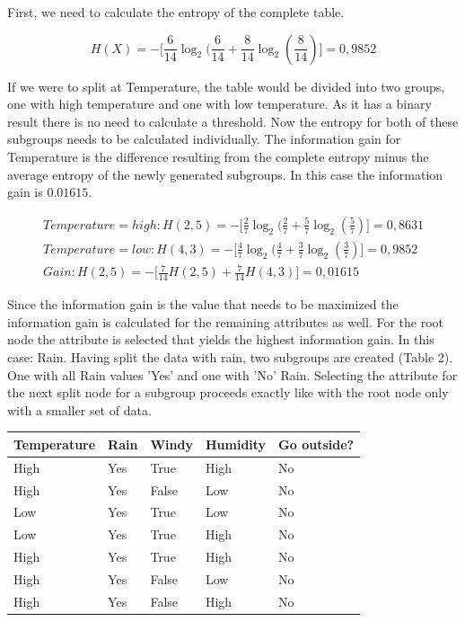 \documentclass[
12pt,
headsepline,
bibliography=totoc,
twoside=semi,
fleqn
]{scrartcl}
\begin{document}
 First, we need to calculate the entropy of the complete table. 

\begin{equation}\label{fig:fig8}
   H(X)= - \biggl[\frac{6}{14}\log_2(\frac{6}{14}+\frac{8}{14}\log_2(\frac{8}{14})\biggr]=0,9852
\end{equation}  

 If we were to split at Temperature, the table would be divided into two groups, one with high temperature and one with low temperature. As it has a binary result there is no need to calculate a threshold. Now the entropy for both of these subgroups needs to be calculated individually. The information gain for Temperature is the difference resulting from the complete entropy minus the average entropy of the newly generated subgroups. In this case the information gain is $0.01615$. 

 \begin{equation}\label{fig:fig7}
   \begin{split}
   Temperature=high: H(2,5)= -\biggl[\frac{2}{7}\log_2(\frac{2}{7}+\frac{5}{7}\log_2(\frac{5}{7})\biggr]=0,8631
   \\
   Temperature=low: H(4,3)= -\biggl[\frac{4}{7}\log_2(\frac{4}{7}+\frac{3}{7}\log_2(\frac{3}{7})\biggr]=0,9852
   \\
   Gain: H(2,5)= -\biggl[\frac{7}{14}H(2,5)+\frac{7}{14}H(4,3)\biggr]=0,01615
\end{split}
\end{equation}  

Since the information gain is the value that needs to be maximized the information gain is calculated for the remaining attributes as well. For the root node the attribute is selected that yields the highest information gain. In this case: Rain. 
Having split the data with rain, two subgroups are created (Table 2). One with all Rain values 'Yes' and one with 'No' Rain. Selecting the attribute for the next split node for a subgroup proceeds exactly like with the root node only with a smaller set of data.


\small\begin{table}[H]
   \begin{tabular}{|l|l|l|l||l|}
      \hline
      Temperature & Rain & Windy & Humidity & Go outside? \\
    \hline
    \hline
    High & Yes & True & High & No \\
    \hline
    High&  Yes& False & Low & No \\
    \hline
    Low& Yes & True & Low & No \\
    \hline
    Low&  Yes& True & High & No \\
    \hline
    High&  Yes& True & High &  No\\
    \hline
    High&  Yes&  False& Low & No \\
    \hline
    High& Yes & False & High & No\\
    \hline
   \end{tabular}
   \label{fig:fig101}
   \end{table}
\end{document}
